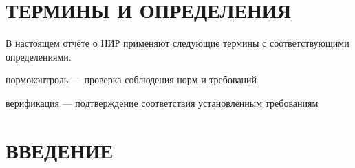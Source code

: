 \section*{ТЕРМИНЫ И ОПРЕДЕЛЕНИЯ}

В настоящем отчёте о НИР применяют следующие термины с соответствующими
определениями.

нормоконтроль — проверка соблюдения норм и требований

верификация — подтверждение соответствия установленным требованиям %

\section*{ВВЕДЕНИЕ}
